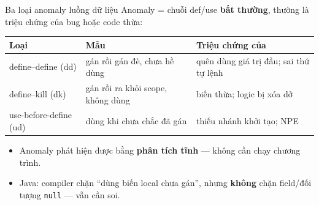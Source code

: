 \documentclass[aspectratio=169,12pt]{beamer}
\begin{document}
\begin{frame}{Ba loại anomaly luồng dữ liệu}
  Anomaly = chuỗi def/use \textbf{bất thường}, thường là triệu chứng
  của bug hoặc code thừa:

  \vspace{0.3em}
  \begin{center}
  \footnotesize
  \setlength{\tabcolsep}{4pt}
  \begin{tabular}{>{\raggedright\arraybackslash}p{3.1cm}>{\raggedright\arraybackslash}p{4.6cm}>{\raggedright\arraybackslash}p{4.0cm}}
    \toprule
    \textbf{Loại} & \textbf{Mẫu} & \textbf{Triệu chứng của} \\
    \midrule
    define--define (dd) & gán rồi gán đè, chưa hề dùng & quên dùng giá trị đầu; sai thứ tự lệnh \\
    define--kill (dk)   & gán rồi ra khỏi scope, không dùng & biến thừa; logic bị xóa dở \\
    use-before-define (ud) & dùng khi chưa chắc đã gán & thiếu nhánh khởi tạo; NPE \\
    \bottomrule
  \end{tabular}
  \end{center}

  \vspace{0.3em}
  \begin{itemize}
    \item Anomaly phát hiện được bằng \textbf{phân tích tĩnh} ---
          không cần chạy chương trình.
    \item Java: compiler chặn ``dùng biến local chưa gán'', nhưng
          \textbf{không} chặn field/đối tượng \texttt{null} --- vẫn cần soi.
  \end{itemize}
\end{frame}
\end{document}
